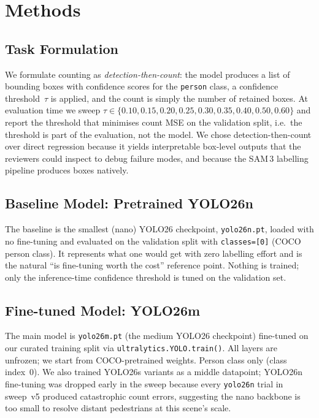 \documentclass{article}
\begin{document}
\section{Methods}
\subsection{Task Formulation}
We formulate counting as \emph{detection-then-count}: the model
produces a list of bounding boxes with confidence scores for the
\texttt{person} class, a confidence threshold~$\tau$ is applied,
and the count is simply the number of retained boxes. At
evaluation time we sweep $\tau \in
\{0.10, 0.15, 0.20, 0.25, 0.30, 0.35, 0.40, 0.50, 0.60\}$
and report the threshold that minimises count MSE on the
validation split, i.e.\ the threshold is part of the evaluation,
not the model. We chose detection-then-count over direct
regression because it yields interpretable box-level outputs that
the reviewers could inspect to debug failure modes, and because
the SAM\,3 labelling pipeline produces boxes natively.

\subsection{Baseline Model: Pretrained YOLO26n}
The baseline is the smallest (nano) YOLO26 checkpoint,
\texttt{yolo26n.pt}, loaded with no fine-tuning and evaluated on
the validation split with \texttt{classes=[0]} (COCO person class).
It represents what one would get with zero labelling effort and is
the natural ``is fine-tuning worth the cost'' reference point.
Nothing is trained; only the inference-time confidence threshold
is tuned on the validation set.

\subsection{Fine-tuned Model: YOLO26m}
The main model is \texttt{yolo26m.pt} (the medium YOLO26
checkpoint) fine-tuned on our curated training split via
\texttt{ultralytics.YOLO.train()}. All layers are unfrozen; we
start from COCO-pretrained weights. Person class only (class
index~0). We also trained YOLO26s variants as a middle datapoint;
YOLO26n fine-tuning was dropped early in the sweep because every
\texttt{yolo26n} trial in sweep~v5 produced catastrophic count
errors, suggesting the nano backbone is too small to resolve
distant pedestrians at this scene's scale.
\end{document}
